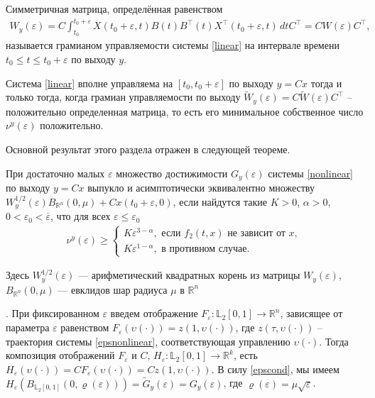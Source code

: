 \documentclass[../main.tex]{subfiles}
\begin{document}
\begin{definition}
	Симметричная матрица, определённая равенством
	\begin{gather*}
		W_y(\varepsilon) = C\int_{t_0}^{t_0+\varepsilon}X(t_0+\varepsilon,t)B(t)B^{\top}(t)X^{\top}(t_0+\varepsilon,t) \, dtC^\top=CW(\varepsilon)C^\top,
	\end{gather*}
	называется грамианом управляемости системы \eqref{linear} на интервале времени $  t_0 \leq t \leq t_0 + \varepsilon $ по выходу $y$.
\end{definition}
	
	Система \eqref{linear} вполне управляема на  $ [t_0, t_0 + \varepsilon] $ по выходу $y=Cx$ тогда и только тогда,
	когда  грамиан управляемости по выходу $ \widetilde{W}_y(\varepsilon) = C \widetilde{W}(\varepsilon) C^{\top}  $ -- положительно определенная матрица, то есть его минимальное собственное число $ \nu^y(\varepsilon) $ положительно.
	
	Основной результат этого раздела отражен в следующей теореме.
	\begin{theorem}\label{th2}
		При достаточно малых $ \varepsilon $ множество достижимости $ G_y(\varepsilon) $ системы \eqref{nonlinear} по выходу $ y = C x $ выпукло и асимптотически эквивалентно множеству $W_y^{1/2}(\varepsilon)B_{\mathbb{R}^n}(0,\mu) + Cx(t_0+\varepsilon,0)$, если найдутся такие $ K>0 $, $ \alpha > 0 $, $ 0< \varepsilon_0<\overline{\varepsilon}  $, что для всех $ \varepsilon \leqslant \varepsilon_0 $
		\begin{gather}\label{cond1}
			\nu^y(\varepsilon) \geqslant \left\{ {\begin{array}{*{20}{l}}
					{K\varepsilon ^{3 - \alpha}, \mbox{\ если \ } f_2(t,x) \mbox{\ не зависит от \ } x}, \\
					{K\varepsilon ^{1 - \alpha}}, \mbox{\ в противном случае}.
			\end{array}} \right.
		\end{gather}
	\end{theorem}
	
	Здесь $W_y^{1/2}(\varepsilon)$ --- арифметический квадратных корень из матрицы $W_y(\varepsilon)$, $ B_{\mathbb{R}^n}(0,\mu) $ --- евклидов шар радиуса $ \mu $ в $ \mathbb{R}^n $
	
	\doc. 
	При фиксированном $ \varepsilon $ введем отображение $ F_{\varepsilon}: \mathbb{L}_2[0,1]  \rightarrow \mathbb{R}^n$, зависящее от параметра $ \varepsilon $ равенством $F_{\varepsilon}(\upsilon(\cdot)) = z(1,\upsilon(\cdot)) $, где  $ z(\tau,\upsilon(\cdot)) $ -- траектория системы \eqref{epsnonlinear}, соответствующая управлению $ \upsilon(\cdot) $. Тогда композиция отображений $ F_{\varepsilon}$ и $ C $, $ H_{\varepsilon}: \mathbb{L}_2[0,1]  \rightarrow \mathbb{R}^k $, есть $ H_{\varepsilon}(\upsilon(\cdot)) = CF_{\varepsilon}(\upsilon(\cdot)) = Cz(1,\upsilon(\cdot)) $. В силу \eqref{epscond}, мы имеем $ H_{\varepsilon}(B_{\mathbb{L}_2[0,1]}(0,\varrho(\varepsilon))) = \widetilde{G}_y(\varepsilon) = G_y(\varepsilon)  $, где $ \varrho(\varepsilon) = \mu \sqrt{\varepsilon} $.
	
\end{document}
